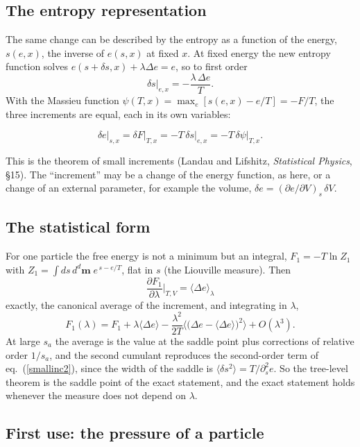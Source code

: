 \documentclass[11pt,aps,preprint,nofootinbib,superscriptaddress,tightenlines]{revtex4-2}
\newcommand{\avg}[1]{\langle #1\rangle}
\def\st{\begin{equation}}
\def\stp{\end{equation}}
\def\Eq#1{eq.~(\ref{#1})}
\begin{document}
\subsection{The entropy representation}
\label{app:smallinc_entropy}

The same change can be described by the entropy as a function of the energy, $s(e,x)$, the inverse of $e(s,x)$ at fixed $x$.  At fixed energy the new entropy
function solves $e(s+\delta s,x)+\lambda\Delta e=e$, so to first order
\st
\delta s\big|_{e,x}=-\frac{\lambda\,\Delta e}{T} .
\stp
With the Massieu function $\psi(T,x)=\max_e[s(e,x)-e/T]=-F/T$, the three increments are equal, each in its own variables:
\begin{keyeq}
\st
\delta e\big|_{s,x}=\delta F\big|_{T,x}=-T\,\delta s\big|_{e,x}=-T\,\delta\psi\big|_{T,x} .
\label{LL}
\stp
\end{keyeq}
This is the theorem of small increments (Landau and Lifshitz, \emph{Statistical Physics}, \S 15).  The ``increment'' may be a change of the energy function, as
here, or a change of an external parameter, for example the volume, $\delta e=(\partial e/\partial V)_s\,\delta V$.

\subsection{The statistical form}
\label{app:smallinc_stat}

For one particle the free energy is not a minimum but an integral, $F_1=-T\ln Z_1$ with $Z_1=\int ds\,d^d\bm m\;e^{\,s-e/T}$, flat in $s$ (the Liouville measure).  Then
\st
\frac{\partial F_1}{\partial\lambda}\Big|_{T,V}=\avg{\Delta e}_\lambda
\stp
exactly, the canonical average of the increment, and integrating in $\lambda$,
\st
F_1(\lambda)=F_1+\lambda\avg{\Delta e}-\frac{\lambda^2}{2T}\Big\langle\big(\Delta e-\avg{\Delta e}\big)^2\Big\rangle+O(\lambda^3) .
\label{cumulant}
\stp
At large $s_a$ the average is the value at the saddle point plus corrections of relative order $1/s_a$, and the second cumulant reproduces the second-order term
of \Eq{smallinc2}, since the width of the saddle is $\avg{\delta s^2}=T/\partial_s^2e$.  So the tree-level theorem is the saddle point of the exact statement, and the
exact statement holds whenever the measure does not depend on $\lambda$.

\subsection{First use: the pressure of a particle}
\label{app:smallinc_pressure}
\end{document}
